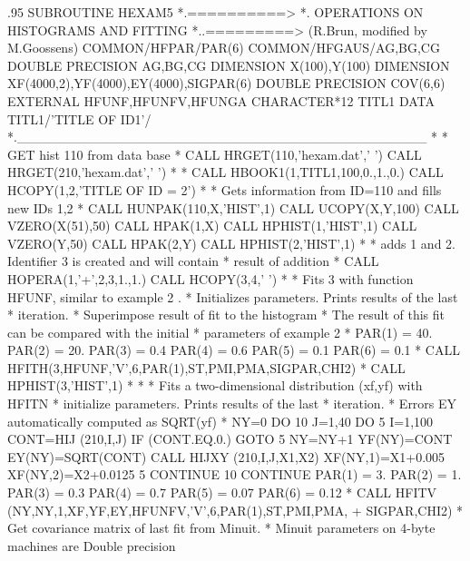 \begin{XMP}\baselineskip.95\baselineskip\relax
      SUBROUTINE HEXAM5
*.==========>
*.           OPERATIONS ON HISTOGRAMS AND FITTING
*..=========> (R.Brun, modified by M.Goossens)
      COMMON/HFPAR/PAR(6)
      COMMON/HFGAUS/AG,BG,CG
      DOUBLE PRECISION AG,BG,CG
      DIMENSION X(100),Y(100)
      DIMENSION XF(4000,2),YF(4000),EY(4000),SIGPAR(6)
      DOUBLE PRECISION COV(6,6)
      EXTERNAL HFUNF,HFUNFV,HFUNGA
      CHARACTER*12 TITL1
      DATA TITL1/'TITLE OF ID1'/
*.___________________________________________
*
*             GET hist 110 from data base
*
      CALL HRGET(110,'hexam.dat',' ')
      CALL HRGET(210,'hexam.dat',' ')
*
*
      CALL HBOOK1(1,TITL1,100,0.,1.,0.)
      CALL HCOPY(1,2,'TITLE OF ID = 2')
*
*             Gets information from ID=110 and fills new IDs 1,2
*
      CALL HUNPAK(110,X,'HIST',1)
      CALL UCOPY(X,Y,100)
      CALL VZERO(X(51),50)
      CALL HPAK(1,X)
      CALL HPHIST(1,'HIST',1)
      CALL VZERO(Y,50)
      CALL HPAK(2,Y)
      CALL HPHIST(2,'HIST',1)
*
*             adds 1 and 2. Identifier 3 is created and will contain
*             result of addition
*
      CALL HOPERA(1,'+',2,3,1.,1.)
      CALL HCOPY(3,4,' ')
*
*             Fits 3 with function HFUNF, similar to example 2 .
*             Initializes parameters. Prints results of the last
*             iteration.
*             Superimpose result of fit to the histogram
*             The result of this fit can be compared with the initial
*             parameters of example 2
*
      PAR(1) = 40.
      PAR(2) = 20.
      PAR(3) = 0.4
      PAR(4) = 0.6
      PAR(5) = 0.1
      PAR(6) = 0.1
*
      CALL HFITH(3,HFUNF,'V',6,PAR(1),ST,PMI,PMA,SIGPAR,CHI2)
*
      CALL HPHIST(3,'HIST',1)
*
*
*            Fits a two-dimensional distribution (xf,yf) with HFITN
*            initialize parameters. Prints results of the last
*            iteration.
*            Errors EY automatically computed as SQRT(yf)
*
      NY=0
      DO 10 J=1,40
         DO 5 I=1,100
            CONT=HIJ (210,I,J)
            IF (CONT.EQ.0.) GOTO 5
            NY=NY+1
            YF(NY)=CONT
            EY(NY)=SQRT(CONT)
            CALL HIJXY (210,I,J,X1,X2)
            XF(NY,1)=X1+0.005
            XF(NY,2)=X2+0.0125
    5    CONTINUE
   10 CONTINUE
      PAR(1) = 3.
      PAR(2) = 1.
      PAR(3) = 0.3
      PAR(4) = 0.7
      PAR(5) = 0.07
      PAR(6) = 0.12
*
      CALL HFITV (NY,NY,1,XF,YF,EY,HFUNFV,'V',6,PAR(1),ST,PMI,PMA,
     +            SIGPAR,CHI2)
*       Get covariance matrix of last fit from Minuit.
*       Minuit parameters on 4-byte machines are Double precision 

\end{XMP}
